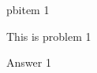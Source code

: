 \documentclass{assignment}
\date{Oct. 1, 2025}
\begin{document}
\begin{problemlist}

  \pbitem pbitem 1

  \begin{problem}
    This is problem 1

    \begin{answer}
      Answer 1
    \end{answer}

  \end{problem}

\end{problemlist}
\end{document}
